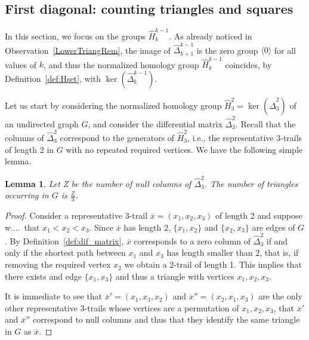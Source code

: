 \documentclass{article}
\newtheorem{lemma}{Lemma}
\newcommand{\giuliaM}[1]{\todo[color=blue!40]{#1}}
\begin{document}
	\subsection{First diagonal: counting triangles and squares}
	\label{FirstDiagonal}
	In this section, we focus on the groups $\widehat{H}_k^{k-1}$.
	As already noticed in Observation~\ref{LowerTriangRem}, the image of $\widehat{\Delta}_{k+1}^{k-1}$ is the zero group $\langle 0 \rangle$ for all values of $k$, and thus the normalized homology group $\widehat{H}_k^{k-1}$ coincides, by Definition~\ref{def:Hset}, with $\ker(\widehat{\Delta}_k^{k-1})$.
	
	Let us start by considering the normalized homology group  $\widehat{H}_3^2=\ker(\widehat{\Delta}_3^2)$ of an undirected graph $G$, and consider the differential matrix $\widehat{\Delta}_3^2$. Recall that the columns of $\widehat{\Delta}_3^2$ correspond to the generators of $\widehat{H}_3^2$, i.e., the representative 3-trails of length 2 in $G$ with no repeated required vertices. We have the following simple lemma.
	
	\begin{lemma}\label{lem:triangles}
		Let Z be the number of null columns of $\widehat{\Delta}_3^2$. The number of triangles occurring in $G$ is $\frac{Z}{3}$.
	\end{lemma}
	
	\begin{proof}
		Consider a representative $3$-trail $\overline{x}=(x_1,x_2,x_3)$ of length 2 and suppose w.\@l.\@o.\@g.\ that $x_1< x_2< x_3$. Since $\overline{x}$ has length 2, $\{x_1,x_2\}$ and $\{x_2,x_3\}$ are edges of $G$. 
		By Definition~\ref{def:dif_matrix}, $\overline{x}$ corresponds to a zero column of $\widehat{\Delta}_3^2$ if and only if the shortest path between $x_1$ and $x_3$ has length smaller than $2$, that is, if removing the required vertex $x_2$ we obtain a 2-trail of length 1. 
		This implies that there exists and edge $\{x_1,x_3\}$ and thus a triangle with vertices $x_1,x_2,x_3$.
		
		It is immediate to see that $\overline{x}'=(x_1,x_3,x_2)$ and $\overline{x}''=(x_2,x_1,x_3)$ are the only other representative 3-trails whose vertices are a permutation of $x_1,x_2,x_3$, that $\overline{x}'$ and $\overline{x}''$ correspond to null columns and thus that they identify the same triangle in $G$ as $\overline{x}$.
	\end{proof}
	
	
\end{document}
